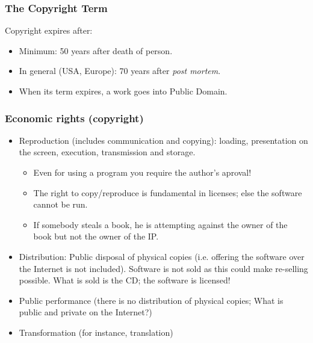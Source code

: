 
\begin{frame}
\frametitle{The Copyright Term}

Copyright expires after:

\begin{itemize}
\item Minimum: 50 years after death of person. 
\item In general (USA, Europe): 70 years after \textit{post mortem}.
\item When its term expires, a work goes into Public Domain.

\end{itemize}

\end{frame}


\begin{frame}
\frametitle{Economic rights (copyright)}

\begin{itemize}
\item Reproduction (includes communication and copying): loading,
presentation on the screen, execution, transmission and storage.
\begin{itemize}
\item Even for using a program you require the author's aproval!
\item The right to copy/reproduce is fundamental in licenses; else
the software cannot be run.
\item If somebody steals a book, he is attempting against the owner
of the book but not the owner of the IP. 
\end{itemize}
\item Distribution: Public disposal of physical copies (i.e. offering
the software over the Internet is not included). Software is not
sold as this could make re-selling possible. What is sold is the CD; the
software is licensed!
\item Public performance (there is no distribution of physical copies; What is public and private
on the Internet?)
\item Transformation (for instance, translation)
\end{itemize}


\end{frame}



